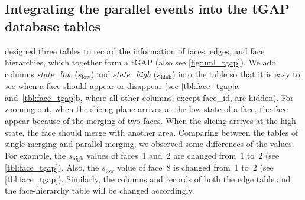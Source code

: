 \documentclass{ica}
\begin{document}
\subsection{Integrating the parallel events into the tGAP database tables}
\label{sec:integrate_tgap}

\citet[]{Meijers2011Thesis} designed three tables 
to record the information of
faces, edges, and face hierarchies, 
which together form a tGAP
(also see \fig\ref{fig:uml_tgap}).
We add columns \emph{state\_low} ($s_\mathrm{low}$) 
and \emph{state\_high} ($s_\mathrm{high}$) into the table 
so that it is easy to see when a face should appear or disappear 
(see \tbls\ref{tbl:face_tgap}a and~\ref{tbl:face_tgap}b,
where all other columns, except face\_id, are hidden).
For zooming out,
when the slicing plane arrives at the low state of a face,
the face appear because of the merging of two faces.
When the slicing arrives at the high state,
the face should merge with another area.
Comparing between the tables of single merging 
and parallel merging,
we observed some differences of the values.
For example, the $s_\mathrm{high}$ values of faces~1 and~2 
are changed from~$1$ to~$2$
(see \tbl\ref{tbl:face_tgap}).
Also, the $s_\mathrm{low}$ value of face~8 is changed from~1 to~2
(see \tbl\ref{tbl:face_tgap}).
Similarly, the columns and records of 
both the edge table and the face-hierarchy table 
will be changed accordingly.
\end{document}
